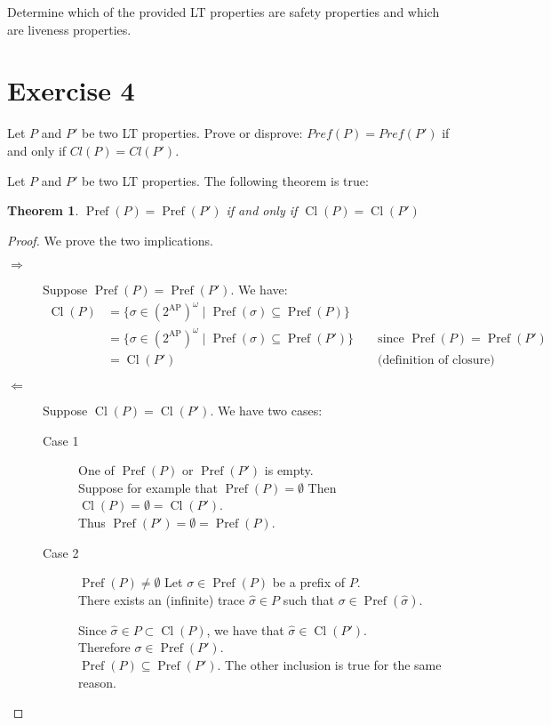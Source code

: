 \documentclass[11pt,a4paper]{article}
\newtheorem*{theorem}{Theorem}
\DeclareMathOperator{\Pref}{Pref}
\DeclareMathOperator{\Cl}{Cl}
\begin{document}
Determine which of the provided LT properties are
safety properties and which are liveness properties. 

\begin{Answer}[number=3]
  \Question%
  \Question%
  \Question%
  \Question%
  \Question%
  \Question%
  \Question%
  \Question%
\end{Answer}

\section*{Exercise 4}
Let $P$ and $P'$ be two LT properties. Prove or disprove: $Pref(P) = Pref(P')$ if and only if $Cl(P) = Cl(P')$.

\begin{Answer}[number=4]
  Let $P$ and $P'$ be two LT properties. The following theorem is true:
  \begin{theorem}
    $\Pref(P) = \Pref(P')$ if and only if $\Cl(P) = \Cl(P')$
  \end{theorem}
  \begin{proof}
    We prove the two implications.
    \begin{description}
      \item[$\Rightarrow$]
        Suppose $\Pref(P) = \Pref(P')$. We have:
        \begin{align*}
          \Cl(P) &= \{\sigma\in{(2^{\textrm{AP}})}^\omega \mid \Pref(\sigma)\subseteq\Pref(P)\}\\
          &= \{\sigma\in{(2^{\textrm{AP}})}^\omega \mid \Pref(\sigma)\subseteq\Pref(P')\} &&\text{ since }\Pref(P) = \Pref(P')\\
          &= \Cl(P')&&\text{ (definition of closure)}
        \end{align*}
      \item[$\Leftarrow$]
        Suppose $\Cl(P) = \Cl(P')$. We have two cases:
        \begin{description}
          \item[Case 1] One of $\Pref(P)$ or $\Pref(P')$ is empty.\\
          Suppose for example that $\Pref(P) = \emptyset$ Then $\Cl(P) = \emptyset = \Cl(P')$.\\
          Thus $\Pref(P') = \emptyset = \Pref(P)$.
          \item[Case 2] $\Pref(P) \neq \emptyset$
          Let $\sigma\in\Pref(P)$ be a prefix of $P$. \\
          There exists an (infinite) trace $\hat{\sigma} \in P$ such that $\sigma\in\Pref(\hat{\sigma})$.

          Since $\hat{\sigma}\in P\subset\Cl(P)$, we have that $\hat{\sigma}\in\Cl(P')$. \\
          Therefore $\sigma\in\Pref(P')$.\\
          $\Pref(P)\subseteq\Pref(P')$. The other inclusion is true for the same reason.

        \end{description}
    \end{description}
  \end{proof}
\end{Answer}
\end{document}
